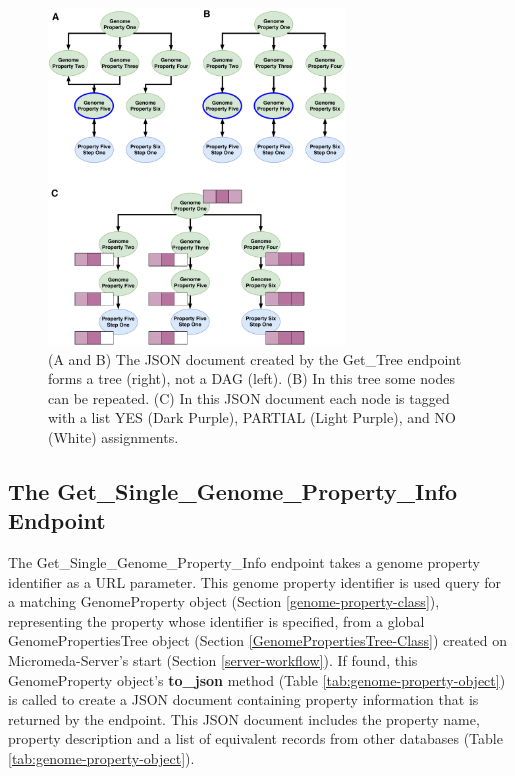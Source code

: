 \begin{figure}[!ht]
  \centering
	\includegraphics[width=0.70\textwidth]{media/Tree-JSON.pdf}
	 \caption{ (A and B) The JSON document created by the Get\_Tree endpoint forms a tree (right), not a DAG (left). (B) In this tree some nodes can be repeated. (C) In this JSON document each node is tagged with a list YES (Dark Purple), PARTIAL (Light Purple), and NO (White) assignments.}
	 \label{fig:tree-json}
\end{figure}


\subsection{The Get\_Single\_Genome\_Property\_Info Endpoint}

The Get\_Single\_Genome\_Property\_Info endpoint takes a genome property identifier as a URL parameter. This genome property identifier is used query for a matching GenomeProperty object (Section \ref{genome-property-class}), representing the property whose identifier is specified, from a global GenomePropertiesTree object (Section \ref{GenomePropertiesTree-Class}) created on Micromeda-Server's start (Section \ref{server-workflow}). If found, this GenomeProperty object's \textbf{to\_json} method (Table \ref{tab:genome-property-object}) is called to create a JSON document containing property information that is returned by the endpoint. This JSON document includes the property name, property description and a list of equivalent records from other databases (Table \ref{tab:genome-property-object}).

